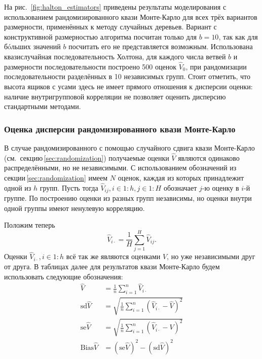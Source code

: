 \documentclass[specialist,
               substylefile = ../spbu.rtx,
               subf,href,colorlinks=true, 12pt]{disser}
\newcommand{\Vhat}{\hat{V}}
\begin{document}
На рис.~\ref{fig:halton_estimators} приведены результаты моделирования с использованием рандомизированного квази Монте-Карло для всех трёх вариантов размерности, применённых к методу случайных деревьев. Вариант с конструктивной размерностью алгоритма посчитан только для $b = 10$, так как для б\'oльших значений $b$ посчитать его не представляется возможным. Использована квазислучайная последовательность Холтона, для каждого числа ветвей $b$ и размерности последовательности построено 500 оценок $\hat V_0$, при рандомизации последовательности разделённых в 10 независимых групп. Стоит отметить, что высота ящиков с усами здесь не имеет прямого отношения к дисперсии оценки: наличие внутригрупповой корреляции не позволяет оценить дисперсию стандартными методами.

\subsubsection{Оценка дисперсии рандомизированного квази Монте-Карло} %
\label{ssub:variance_estimation_QMC}

В случае рандомизированного с помощью случайного сдвига квази Монте-Карло (см.~секцию\,\ref{sec:randomization}) получаемые оценки $\Vhat$ являются одинаково распределёнными, но не независимыми. С использованием обозначений из секции\,\ref{sec:randomization} имеем $N$ оценок, каждая из которых принадлежит одной из $h$ групп. Пусть тогда $\Vhat_{ij}, i\in 1\mathbin{:}h, j \in 1\mathbin{:}H$ обозначает $j$-ю оценку в $i$-й группе. По построению оценки из разных групп независимы, но оценки внутри одной группы имеют ненулевую корреляцию. 

Положим теперь 
$$\Vhat_{i\cdot} = \frac{1}{H}\sum_{j=1}^H \Vhat_{ij}.$$
Оценки $\Vhat_{i\cdot}, i\in 1\mathbin{:}h$ всё так же являются оценками $V$, но уже независимыми друг от друга. В таблицах далее для результатов квази Монте-Карло будем использовать следующие обозначения:
\begin{equation}
\begin{aligned}
	\Vhat &= \frac{1}{n}\sum_{i=1}^n \Vhat_{i\cdot} \\
	\mathrm{sd}\Vhat &= \sqrt{\frac{1}{n}\sum_{i=1}^n \left(\Vhat_{i\cdot} - \Vhat\right)^2} \\
	\mathrm{se}\Vhat &= \sqrt{\frac{1}{n}\sum_{i=1}^n \left(\Vhat_{i\cdot} - V\right)^2} \\
	\mathrm{Bias}\Vhat &= \left(\mathrm{se}\Vhat\right)^2 - \left(\mathrm{sd}\Vhat\right)^2
\end{aligned}
\end{equation}
\end{document}
